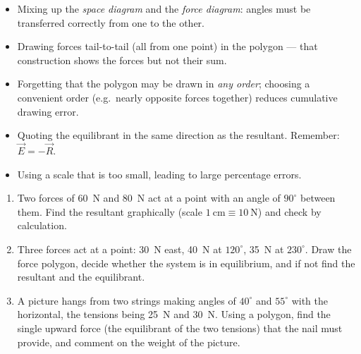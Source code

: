 \documentclass[11pt]{article}
\begin{document}
\begin{attention}
\begin{itemize}
\item Mixing up the \emph{space diagram} and the \emph{force diagram}: angles must be transferred correctly from one to the other.
\item Drawing forces tail-to-tail (all from one point) in the polygon — that construction shows the forces but not their sum.
\item Forgetting that the polygon may be drawn in \emph{any order}; choosing a convenient order (e.g.\ nearly opposite forces together) reduces cumulative drawing error.
\item Quoting the equilibrant in the same direction as the resultant. Remember: $\vec{E} = -\vec{R}$.
\item Using a scale that is too small, leading to large percentage errors.
\end{itemize}
\end{attention}

\begin{exercice}
\begin{enumerate}
\item Two forces of \SI{60}{N} and \SI{80}{N} act at a point with an angle of $90^{\circ}$ between them. Find the resultant graphically (scale $1\ \mathrm{cm} \equiv 10\ \mathrm{N}$) and check by calculation.
\item Three forces act at a point: \SI{30}{N} east, \SI{40}{N} at $120^{\circ}$, \SI{35}{N} at $230^{\circ}$. Draw the force polygon, decide whether the system is in equilibrium, and if not find the resultant and the equilibrant.
\item A picture hangs from two strings making angles of $40^{\circ}$ and $55^{\circ}$ with the horizontal, the tensions being \SI{25}{N} and \SI{30}{N}. Using a polygon, find the single upward force (the equilibrant of the two tensions) that the nail must provide, and comment on the weight of the picture.
\end{enumerate}
\end{exercice}
\end{document}
